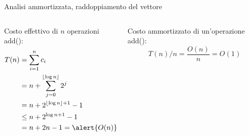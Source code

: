 \begin{frame}{Analisi ammortizzata, raddoppiamento del vettore}
	
\vspace{-9pt}
\begin{columns}[T]
\begin{column}{0.57\textwidth}
\alert{Costo effettivo di $n$ operazioni \textsf{add}()}:
\begin{align*}
  T(n) &= \sum_{i=1}^n c_i \\
       &= n + \sum_{j=0}^{\lfloor \log n \rfloor} 2^j \\
	   &=  n + 2^{\lfloor \log n \rfloor + 1} - 1 \\
	   &\leq  n + 2^{\log n + 1} - 1 \\
	   &=  n + 2n - 1 = \alert{O(n)}
\end{align*}
\end{column}
\begin{column}{0.43\textwidth}
\alert{Costo ammortizzato di un'operazione \textsf{add}()}: \[ T(n)/n = \frac{O(n)}{n} = O(1)\]
\end{column}
\end{columns}

\end{frame}

